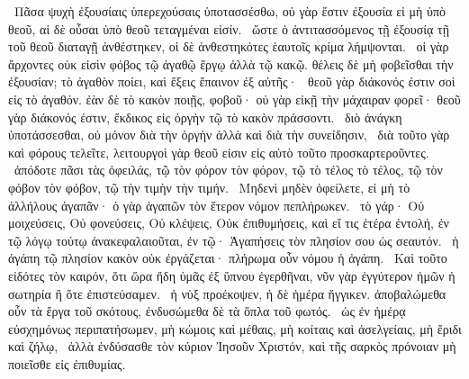 ~Πᾶσα ψυχὴ ἐξουσίαις ὑπερεχούσαις ὑποτασσέσθω, οὐ γὰρ ἔστιν ἐξουσία εἰ μὴ ὑπὸ θεοῦ, αἱ δὲ οὖσαι ὑπὸ θεοῦ τεταγμέναι εἰσίν.
~ὥστε ὁ ἀντιτασσόμενος τῇ ἐξουσίᾳ τῇ τοῦ θεοῦ διαταγῇ ἀνθέστηκεν, οἱ δὲ ἀνθεστηκότες ἑαυτοῖς κρίμα λήμψονται.
~οἱ γὰρ ἄρχοντες οὐκ εἰσὶν φόβος τῷ ἀγαθῷ ἔργῳ ἀλλὰ τῷ κακῷ. θέλεις δὲ μὴ φοβεῖσθαι τὴν ἐξουσίαν; τὸ ἀγαθὸν ποίει, καὶ ἕξεις ἔπαινον ἐξ αὐτῆς·
~θεοῦ γὰρ διάκονός ἐστιν σοὶ εἰς τὸ ἀγαθόν. ἐὰν δὲ τὸ κακὸν ποιῇς, φοβοῦ· οὐ γὰρ εἰκῇ τὴν μάχαιραν φορεῖ· θεοῦ γὰρ διάκονός ἐστιν, ἔκδικος εἰς ὀργὴν τῷ τὸ κακὸν πράσσοντι.
~διὸ ἀνάγκη ὑποτάσσεσθαι, οὐ μόνον διὰ τὴν ὀργὴν ἀλλὰ καὶ διὰ τὴν συνείδησιν,
~διὰ τοῦτο γὰρ καὶ φόρους τελεῖτε, λειτουργοὶ γὰρ θεοῦ εἰσιν εἰς αὐτὸ τοῦτο προσκαρτεροῦντες.
~ἀπόδοτε πᾶσι τὰς ὀφειλάς, τῷ τὸν φόρον τὸν φόρον, τῷ τὸ τέλος τὸ τέλος, τῷ τὸν φόβον τὸν φόβον, τῷ τὴν τιμὴν τὴν τιμήν.
~Μηδενὶ μηδὲν ὀφείλετε, εἰ μὴ τὸ ἀλλήλους ἀγαπᾶν· ὁ γὰρ ἀγαπῶν τὸν ἕτερον νόμον πεπλήρωκεν.
~τὸ γάρ· Οὐ μοιχεύσεις, Οὐ φονεύσεις, Οὐ κλέψεις, Οὐκ ἐπιθυμήσεις, καὶ εἴ τις ἑτέρα ἐντολή, ἐν τῷ λόγῳ τούτῳ ἀνακεφαλαιοῦται, ἐν τῷ· Ἀγαπήσεις τὸν πλησίον σου ὡς σεαυτόν.
~ἡ ἀγάπη τῷ πλησίον κακὸν οὐκ ἐργάζεται· πλήρωμα οὖν νόμου ἡ ἀγάπη.
~Καὶ τοῦτο εἰδότες τὸν καιρόν, ὅτι ὥρα ἤδη ὑμᾶς ἐξ ὕπνου ἐγερθῆναι, νῦν γὰρ ἐγγύτερον ἡμῶν ἡ σωτηρία ἢ ὅτε ἐπιστεύσαμεν.
~ἡ νὺξ προέκοψεν, ἡ δὲ ἡμέρα ἤγγικεν. ἀποβαλώμεθα οὖν τὰ ἔργα τοῦ σκότους, ἐνδυσώμεθα δὲ τὰ ὅπλα τοῦ φωτός.
~ὡς ἐν ἡμέρᾳ εὐσχημόνως περιπατήσωμεν, μὴ κώμοις καὶ μέθαις, μὴ κοίταις καὶ ἀσελγείαις, μὴ ἔριδι καὶ ζήλῳ,
~ἀλλὰ ἐνδύσασθε τὸν κύριον Ἰησοῦν Χριστόν, καὶ τῆς σαρκὸς πρόνοιαν μὴ ποιεῖσθε εἰς ἐπιθυμίας.

